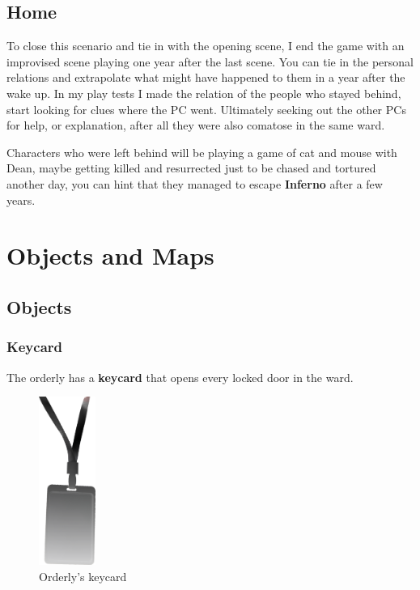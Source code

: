 \documentclass[bg-full]{resources/stylesheets/kult}
\begin{document}
\subsection{Home}%
\label{sub:home}

To close this scenario and tie in with the opening scene, I end the game with an improvised scene playing one year after the
last scene.  You can tie in the personal relations and extrapolate what might have happened to them in a year after the wake up.
In my play tests I made the relation of the people who stayed behind, start looking for clues where the PC went.  Ultimately
seeking out the other PCs for help, or explanation, after all they were also comatose in the same ward.

Characters who were left behind will be playing a game of cat and mouse with Dean, maybe getting killed and
resurrected just to be chased and tortured another day, you can hint that they managed to escape \textbf{Inferno} after a few
years.

\clearpage %
\section{Objects and Maps}%
\label{sec:objects_and_maps}

\twocolumn
\subsection{Objects}%
\label{sub:objects}

\subsubsection{Keycard}%
\label{ssub:keycard}

The orderly has a \textbf{keycard} that opens every locked door in the ward.
\begin{figure}[!htbp]
  \includegraphics[height=5.5cm, keepaspectratio]{resources/img/keycard.png}
  \caption{Orderly's keycard}\label{keycard}
\end{figure}
\end{document}
